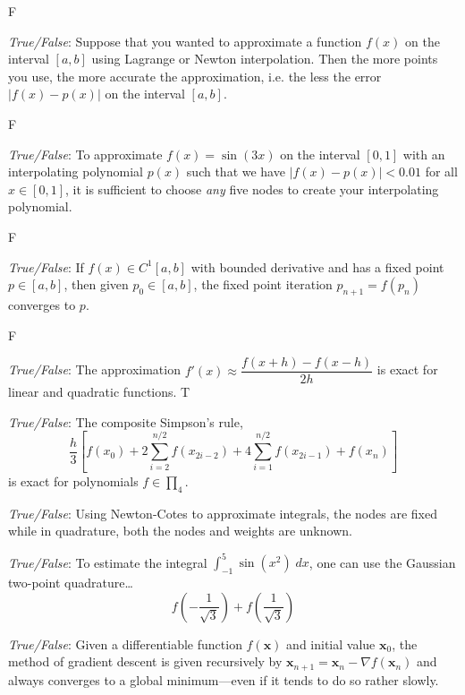 \documentclass[11pt,letterpaper]{article}
\begin{document}
F


\quizsol \textit{True/False}: Suppose that you wanted to approximate a function $f(x)$ on the interval $[a, b]$ using Lagrange or Newton interpolation. Then the more points you use, the more accurate the approximation, i.e. the less the error $|f(x) - p(x)|$ on the interval $[a, b]$. 

F



\quizsol \textit{True/False}: To approximate $f(x)= \sin(3x)$ on the interval $[0, 1]$ with an interpolating polynomial $p(x)$ such that we have $|f(x) - p(x)| < 0.01$ for all $x \in [0, 1]$, it is sufficient to choose \textit{any} five nodes to create your interpolating polynomial. 

F


\quizsol \textit{True/False}: If $f(x) \in C^1[a, b]$ with bounded derivative and has a fixed point $p \in [a, b]$, then given $p_0 \in [a, b]$, the fixed point iteration $p_{n+1}= f(p_n)$ converges to $p$. 

F


\quizsol \textit{True/False}: The approximation $f'(x) \approx \dfrac{f(x + h) - f(x - h)}{2h}$ is exact for linear and quadratic functions. 
T



\quizsol \textit{True/False}: The composite Simpson's rule, 
	\[
	\dfrac{h}{3} \left[ f(x_0) + 2 \sum_{i=2}^{n/2} f(x_{2i-2}) + 4 \sum_{i=1}^{n/2} f(x_{2i-1}) + f(x_n) \right]
	\]
is exact for polynomials $f \in \prod_4$. 



\quizsol \textit{True/False}: Using Newton-Cotes to approximate integrals, the nodes are fixed while in quadrature, both the nodes and weights are unknown. 



\quizsol \textit{True/False}: To estimate the integral $\displaystyle \int_{-1}^5 \sin(x^2) \;dx$, one can use the Gaussian two-point quadrature\dots
	\[
	f\left( -\dfrac{1}{\sqrt{3}} \right) + f\left( \dfrac{1}{\sqrt{3}} \right)
	\]



\quizsol \textit{True/False}: Given a differentiable function $f(\mathbf{x})$ and initial value $\mathbf{x}_0$, the method of gradient descent is given recursively by $\mathbf{x}_{n+1}= \mathbf{x}_n - \nabla f(\mathbf{x}_n)$ and always converges to a global minimum---even if it tends to do so rather slowly. 
\end{document}
